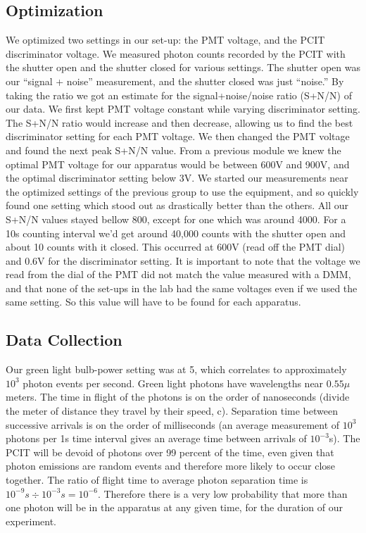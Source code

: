 \documentclass[prb,preprint]{revtex4-1}
\begin{document}
\subsection{Optimization}
We optimized two settings in our set-up: the PMT voltage, and the PCIT discriminator voltage.  We measured photon counts recorded by the PCIT with the shutter open and the shutter closed for various settings.  The shutter open was our ``signal + noise'' measurement, and the shutter closed was just ``noise.'' By taking the ratio we got an estimate for the signal+noise/noise ratio (S+N/N) of our data. We first kept PMT voltage constant while varying discriminator setting.  The S+N/N ratio would increase and then decrease, allowing us to find the best discriminator setting for each PMT voltage.  We then changed the PMT voltage and found the next peak S+N/N value. From a previous module we knew the optimal PMT voltage for our apparatus would be between 600V and 900V, and the optimal discriminator setting below 3V.  We started our measurements near the optimized settings of the previous group to use the equipment, and so quickly found one setting which stood out as drastically better than the others.  All our S+N/N values stayed bellow 800, except for one which was around 4000.  For a 10s counting interval we'd get around 40,000 counts with the shutter open and about 10 counts with it closed.  This occurred at 600V (read off the PMT dial) and 0.6V for the discriminator setting. It is important to note that the voltage we read from the dial of the PMT did not match the value measured with a DMM, and that none of the set-ups in the lab had the same voltages even if we used the same setting.  So this value will have to be found for each apparatus. 

\subsection{Data Collection}

Our green light bulb-power setting was at 5, which correlates to approximately $10^{3}$ photon events per second.  Green light photons have wavelengths near $0.55 \mu $ meters. The time in flight of the photons is on the order of nanoseconds (divide the meter of distance they travel by their speed, c).  Separation time between successive arrivals is on the order of milliseconds (an average measurement of $10^3$ photons per 1s time interval gives an average time between arrivals of $10^{-3}$s).  The PCIT will be devoid of photons over 99 percent of the time, even given that photon emissions are random events and therefore more likely to occur close together.  The ratio of flight time to average photon separation time is $10^{-9}s \div 10^{-3}s = 10^{-6}$. Therefore there is a very low probability that more than one photon will be in the apparatus at any given time, for the duration of our experiment.
\end{document}
